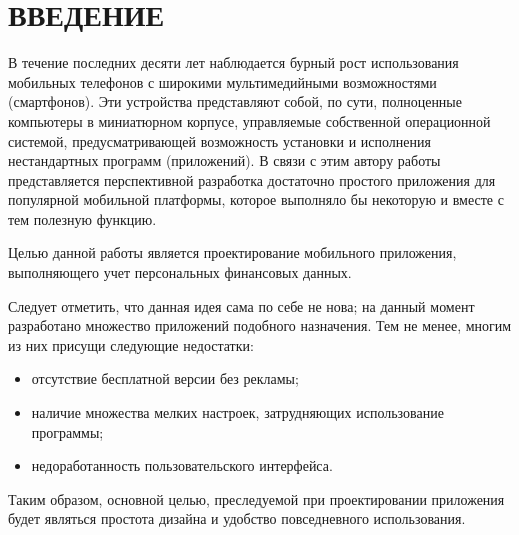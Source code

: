 \section*{ВВЕДЕНИЕ}

В течение последних десяти лет наблюдается бурный рост
использования мобильных телефонов с широкими мультимедийными
возможностями (смартфонов). Эти устройства представляют собой,
по сути, полноценные компьютеры в миниатюрном корпусе,
управляемые собственной операционной системой,
предусматривающей возможность установки и исполнения
нестандартных программ (приложений).
В связи с этим автору работы представляется перспективной разработка
достаточно простого приложения для популярной мобильной платформы,
которое выполняло бы некоторую и вместе с тем полезную функцию.

Целью данной работы является проектирование мобильного приложения,
выполняющего учет персональных финансовых данных.

Следует отметить, что данная идея сама по себе не нова;
на данный момент разработано множество приложений подобного назначения.
Тем не менее, многим из них присущи следующие недостатки:
\begin{itemize}
\item отсутствие бесплатной версии без рекламы;
\item наличие множества мелких настроек, затрудняющих использование программы;
\item недоработанность пользовательского интерфейса.
\end{itemize}

Таким образом, основной целью, преследуемой при проектировании приложения
будет являться простота дизайна и удобство повседневного использования.
